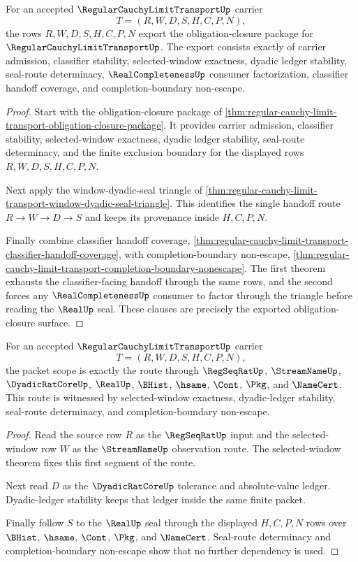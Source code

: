 \begin{theorem}
\label{thm:regular-cauchy-limit-transport-obligation-closure-export}
For an accepted $\RegularCauchyLimitTransportUp$ carrier
$$
T=(R,W,D,S,H,C,P,N),
$$
the rows $R,W,D,S,H,C,P,N$ export the obligation-closure package for $\RegularCauchyLimitTransportUp$. The export consists exactly of carrier admission, classifier stability, selected-window exactness, dyadic ledger stability, seal-route determinacy, $\RealCompletenessUp$ consumer factorization, classifier handoff coverage, and completion-boundary non-escape.
\end{theorem}
\begin{proof}
Start with the obligation-closure package of \autoref{thm:regular-cauchy-limit-transport-obligation-closure-package}. It provides carrier admission, classifier stability, selected-window exactness, dyadic ledger stability, seal-route determinacy, and the finite exclusion boundary for the displayed rows $R,W,D,S,H,C,P,N$.

Next apply the window-dyadic-seal triangle of \autoref{thm:regular-cauchy-limit-transport-window-dyadic-seal-triangle}. This identifies the single handoff route $R \to W \to D \to S$ and keeps its provenance inside $H,C,P,N$.

Finally combine classifier handoff coverage, \autoref{thm:regular-cauchy-limit-transport-classifier-handoff-coverage}, with completion-boundary non-escape, \autoref{thm:regular-cauchy-limit-transport-completion-boundary-nonescape}. The first theorem exhausts the classifier-facing handoff through the same rows, and the second forces any $\RealCompletenessUp$ consumer to factor through the triangle before reading the $\RealUp$ seal. These clauses are precisely the exported obligation-closure surface.
\end{proof}

\begin{theorem}
\label{thm:regular-cauchy-limit-transport-scoped-dependency-boundary}
For an accepted $\RegularCauchyLimitTransportUp$ carrier
$$
T=(R,W,D,S,H,C,P,N),
$$
the packet scope is exactly the route through $\RegSeqRatUp$, $\StreamNameUp$, $\DyadicRatCoreUp$, $\RealUp$, $\BHist$, $\hsame$, $\Cont$, $\Pkg$, and $\NameCert$. This route is witnessed by selected-window exactness, dyadic-ledger stability, seal-route determinacy, and completion-boundary non-escape.
\end{theorem}
\begin{proof}
Read the source row $R$ as the $\RegSeqRatUp$ input and the selected-window row $W$ as the $\StreamNameUp$ observation route. The selected-window theorem fixes this first segment of the route.

Next read $D$ as the $\DyadicRatCoreUp$ tolerance and absolute-value ledger. Dyadic-ledger stability keeps that ledger inside the same finite packet.

Finally follow $S$ to the $\RealUp$ seal through the displayed $H,C,P,N$ rows over $\BHist$, $\hsame$, $\Cont$, $\Pkg$, and $\NameCert$. Seal-route determinacy and completion-boundary non-escape show that no further dependency is used.
\end{proof}

